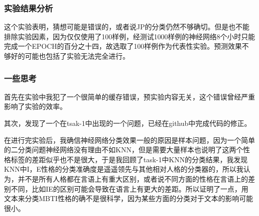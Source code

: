 \documentclass{article}
\begin{document}
	\subsubsection{实验结果分析}
	这个实验表明，猜想可能是错误的，或者说JP的分类仍然不够确切。但是也不能排除实验因素，因为仅仅使用了100样例，经测试1000样例的神经网络8个小时只能完成一个EPOCH的百分之十四，故选取了100样例作为代表性实验。预测效果不够好的可能也包括了实验无法完全进行。
	\subsubsection{一些思考}
	首先在实验中我犯了一个很简单的缓存错误，预实验内容无关，这个错误曾经严重影响了实验的效率。
	
	其次，发现了一个在tsak-1中出现的一个问题，已经在github中完成代码的修正。
	
	在进行完实验后，我确信神经网络分类效果一般的原因是样本问题，因为一个简单的二分类问题神经网络没有理由不如KNN，但是需要大量样本也说明了这两个性格标签的差距似乎也不是很大，于是我回顾了task-1中KNN的分类结果，我发现KNN中I，E性格的分类准确度是遥遥领先与其他相对人格的分类器的，所以我认为，并不是所有人格都在言语上有重大区别，或者说不同方面的性格在言语上的差别不同，比如IE的区别可能会导致在语言上有更大的差距。所以证明了一点，用文本来分类MBTI性格的确不是很科学，因为某些方面的分类对于文本的影响可能很小。
\end{document}
